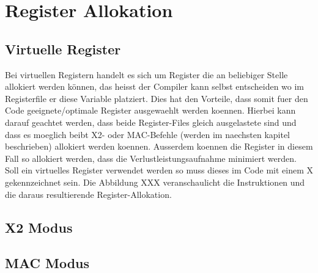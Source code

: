 \section{Register Allokation}
\label{sec:register allok}
\subsection{Virtuelle Register}
Bei virtuellen Registern handelt es sich um Register die an beliebiger Stelle allokiert werden können, das heisst der Compiler kann selbst entscheiden wo im Registerfile er diese Variable platziert. Dies hat den Vorteile, dass somit fuer den Code geeignete/optimale Register ausgewaehlt werden koennen. Hierbei kann darauf geachtet werden, dass beide Register-Files gleich ausgelastete sind und dass es moeglich beibt X2- oder MAC-Befehle (werden im naechsten kapitel beschrieben) allokiert werden koennen. Ausserdem koennen die Register in diesem Fall so allokiert werden, dass die Verlustleistungsaufnahme minimiert werden. Soll ein virtuelles Register verwendet werden so muss dieses im Code mit einem X gekennzeichnet sein. Die Abbildung XXX veranschaulicht die Instruktionen und die daraus resultierende Register-Allokation. 
\subsection{X2 Modus}
\subsection{MAC Modus}